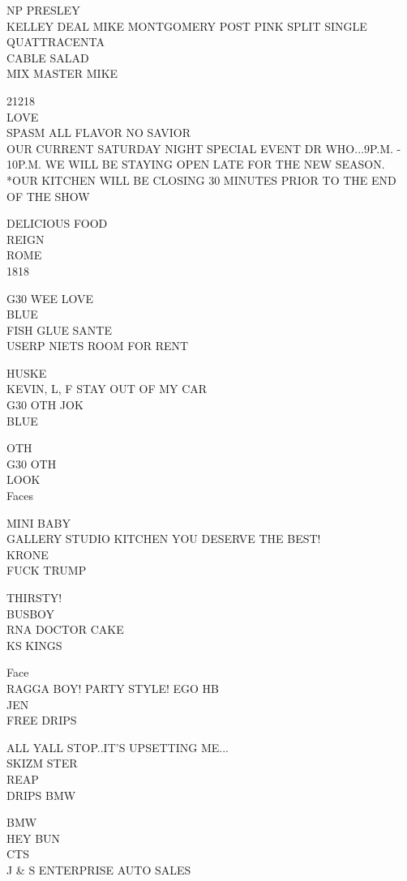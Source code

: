 \documentclass[10pt,letterpaper]{article}
\begin{document}
NP PRESLEY\\
KELLEY DEAL MIKE MONTGOMERY POST PINK SPLIT SINGLE QUATTRACENTA\\
CABLE SALAD\\
MIX MASTER MIKE

21218\\
LOVE\\
SPASM ALL FLAVOR NO SAVIOR\\
OUR CURRENT SATURDAY NIGHT SPECIAL EVENT DR WHO...9P.M. {-} 10P.M. WE WILL BE STAYING OPEN LATE FOR THE NEW SEASON.  *OUR KITCHEN WILL BE CLOSING 30 MINUTES PRIOR TO THE END OF THE SHOW

DELICIOUS FOOD\\
REIGN\\
ROME\\
1818

G30 WEE LOVE\\
BLUE\\
FISH GLUE SANTE\\
USERP NIETS ROOM FOR RENT

HUSKE\\
KEVIN, L, F STAY OUT OF MY CAR\\
G30 OTH JOK\\
BLUE

OTH\\
G30 OTH\\
LOOK\\
Faces

MINI BABY\\
GALLERY STUDIO KITCHEN YOU DESERVE THE BEST!\\
KRONE\\
FUCK TRUMP

THIRSTY!\\
BUSBOY\\
RNA DOCTOR CAKE\\
KS KINGS

Face\\
RAGGA BOY!  PARTY STYLE!  EGO HB\\
JEN\\
FREE DRIPS

ALL YALL STOP..IT'S UPSETTING ME...\\
SKIZM STER\\
REAP\\
DRIPS BMW

BMW\\
HEY BUN\\
CTS\\
J \& S ENTERPRISE AUTO SALES
\end{document}
